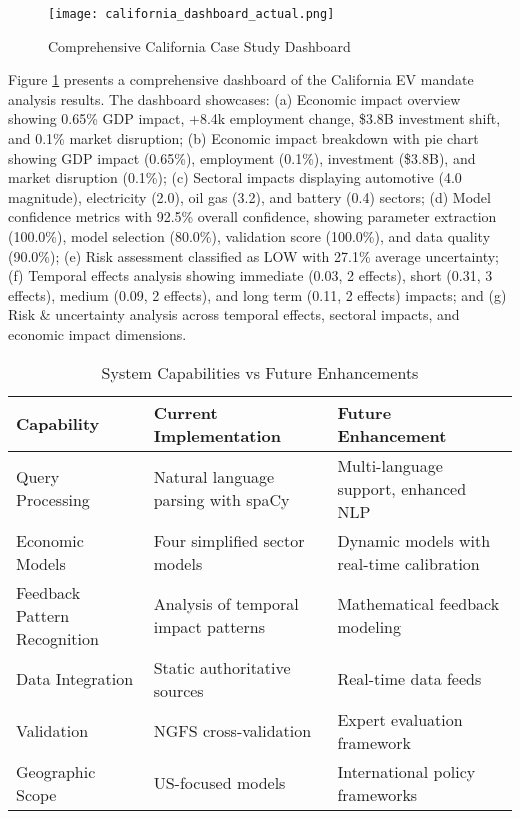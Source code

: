 \documentclass[conference]{IEEEtran}
\begin{document}
\begin{figure}[htbp]
\centerline{\texttt{[image: california\_dashboard\_actual.png]}}
\caption{Comprehensive California Case Study Dashboard}
\label{fig:dashboard}
\end{figure}

Figure \ref{fig:dashboard} presents a comprehensive dashboard of the California EV mandate analysis results. The dashboard showcases: (a) Economic impact overview showing 0.65\% GDP impact, +8.4k employment change, \$3.8B investment shift, and 0.1\% market disruption; (b) Economic impact breakdown with pie chart showing GDP impact (0.65\%), employment (0.1\%), investment (\$3.8B), and market disruption (0.1\%); (c) Sectoral impacts displaying automotive (4.0 magnitude), electricity (2.0), oil gas (3.2), and battery (0.4) sectors; (d) Model confidence metrics with 92.5\% overall confidence, showing parameter extraction (100.0\%), model selection (80.0\%), validation score (100.0\%), and data quality (90.0\%); (e) Risk assessment classified as LOW with 27.1\% average uncertainty; (f) Temporal effects analysis showing immediate (0.03, 2 effects), short (0.31, 3 effects), medium (0.09, 2 effects), and long term (0.11, 2 effects) impacts; and (g) Risk \& uncertainty analysis across temporal effects, sectoral impacts, and economic impact dimensions.

\begin{table}[htbp]
\caption{System Capabilities vs Future Enhancements}
\begin{center}
\begin{tabular}{|p{2.5cm}|p{2.5cm}|p{2cm}|}
\hline
\textbf{Capability} & \textbf{Current Implementation} & \textbf{Future Enhancement} \\
\hline
Query Processing & Natural language parsing with spaCy & Multi-language support, enhanced NLP \\
\hline
Economic Models & Four simplified sector models & Dynamic models with real-time calibration \\
\hline
Feedback Pattern Recognition & Analysis of temporal impact patterns & Mathematical feedback modeling \\
\hline
Data Integration & Static authoritative sources & Real-time data feeds \\
\hline
Validation & NGFS cross-validation & Expert evaluation framework \\
\hline
Geographic Scope & US-focused models & International policy frameworks \\
\hline
\end{tabular}
\label{tab:capabilities}
\end{center}
\end{table}
\end{document}
